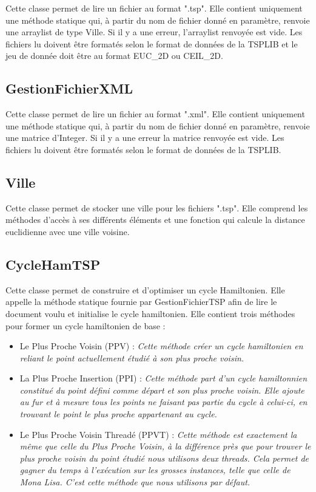 \documentclass{article}
\begin{document}
Cette classe permet de lire un fichier au format ".tsp".
Elle contient uniquement une méthode statique qui, à partir du nom de fichier donné en paramètre, renvoie une arraylist de type Ville.
Si il y a une erreur, l'arraylist renvoyée est vide.
Les fichiers lu doivent être formatés selon le format de données de la TSPLIB et le jeu de donnée doit être au format EUC\_2D ou CEIL\_2D.

\subsection{GestionFichierXML}

Cette classe permet de lire un fichier au format ".xml".
Elle contient uniquement une méthode statique qui, à partir du nom de fichier donné en paramètre, renvoie une matrice d'Integer.
Si il y a une erreur la matrice renvoyée est vide.
Les fichiers lu doivent être formatés selon le format de données de la TSPLIB.

\subsection{Ville}

Cette classe permet de stocker une ville pour les fichiers ".tsp".
Elle comprend les méthodes d'accès à ses différents éléments et une fonction qui calcule la distance euclidienne avec une ville voisine.

\subsection{CycleHamTSP}

Cette classe permet de construire et d'optimiser un cycle Hamiltonien.
Elle appelle la méthode statique fournie par GestionFichierTSP afin de lire le document voulu et initialise le cycle hamiltonien.
Elle contient trois méthodes pour former un cycle hamiltonien de base :

\begin{itemize}
\item Le Plus Proche Voisin (PPV) : \emph{Cette méthode créer un cycle hamiltonien en reliant le point actuellement étudié à son plus proche voisin.}\smallskip

\item La Plus Proche Insertion (PPI) : \emph{Cette méthode part d'un cycle hamiltonnien constitué du point défini comme départ et son plus proche voisin. Elle ajoute au fur et à mesure tous les points ne faisant pas partie du cycle à celui-ci, en trouvant le point le plus proche appartenant au cycle.}\smallskip

\item Le Plus Proche Voisin Threadé (PPVT) : \emph{Cette méthode est exactement la même que celle du Plus Proche Voisin, à la différence près que pour trouver le plus proche voisin du point étudié nous utilisons deux threads. Cela permet de gagner du temps à l'exécution sur les grosses instances, telle que celle de Mona Lisa. C'est cette méthode que nous utilisons par défaut.}
\end{itemize}
\end{document}

